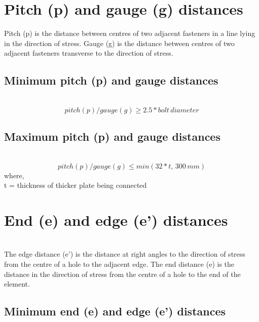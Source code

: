 \documentclass[11.5pt,a4paper,oneside]{report}
\begin{document}
\begin{Form}
\section{Pitch (p) and gauge (g) distances}
	Pitch (p) is the distance between centres of two adjacent fasteners in a line lying in the direction of stress.
	Gauge (g) is the distance between centres of two adjacent fasteners transverse to the direction of stress.

\subsection{Minimum pitch (p) and gauge distances}
	\qquad \qquad [Reference: Cl. 10.2.2, IS 800 : 2007]\\
		\begin{equation}
			 pitch (p)/gauge (g) \ge 2.5 * bolt\, diameter
		\end{equation}
				
\subsection{Maximum pitch (p) and gauge distances}
\qquad \qquad [Reference: Cl. 10.2.3, IS 800 : 2007]\\				
		\begin{equation}
			pitch (p)/gauge (g) \leq min(32 * t,\, 300\, mm)
		\end{equation}
		where, \\
			\indent t = thickness of thicker plate being connected 

\section{End (e) and edge (e') distances}
				
\qquad {} \\
 
The edge distance (e') is the distance at right angles to the direction of stress from the centre of a hole to the adjacent edge. The end distance (e) is the distance in the direction of stress from the centre of a hole to the end of the element.

\subsection{Minimum end (e) and edge (e') distances}
\qquad \qquad [Reference: Cl. 10.2.4.2, IS 800 : 2007]\\


\end{Form}
\end{document}
